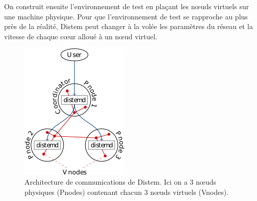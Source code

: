 On construit ensuite l'environnement de test en plaçant les n\oe uds virtuels
sur une machine physique. Pour que l'environnement de test se rapproche au plus
près de la réalité, Distem peut changer à la volée les paramètres du réseau et
la vitesse de chaque c\oe ur alloué à un n\oe ud virtuel.

\begin{figure}
  \centering
  \includegraphics{Pictures/png/Distem_architecture}
  \caption[Architecture de communications de Distem]{Architecture de communications de Distem. Ici on a 3 n\oe uds physiques (Pnodes) contenant chacun 3 n\oe uds virtuels (Vnodes).}
  \label{Distem_archi}
\end{figure}


